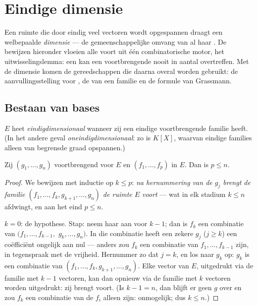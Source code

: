 \chapter{Eindige dimensie}\label{ch:b1:findim}

Een ruimte die door eindig veel vectoren wordt opgespannen draagt
een welbepaalde \emph{dimensie} --- de gemeenschappelijke omvang van
al haar . De bewijzen hieronder vloeien alle voort uit één
combinatorische motor, het uitwisselingslemma: een  kan
een voortbrengende nooit in aantal overtreffen. Met de dimensie
komen de gereedschappen die daarna overal worden gebruikt: de
aanvullingsstelling voor , de  van een familie en de
formule van Grassmann.

\section{Bestaan van bases}

\begin{definition}\label{def:b1:findim:def}
$E$ heet \emph{eindigdimensionaal} wanneer
zij een eindige voortbrengende familie heeft. (In het andere geval
\emph{oneindigdimensionaal}: zo is $K[X]$, waarvan eindige families
alleen  van begrensde graad opspannen.)
\end{definition}

\begin{theorem}[Uitwisselingslemma]\label{thm:b1:findim:exchange}
Zij $(g_1, \dots, g_n)$ voortbrengend voor $E$ en $(f_1, \dots,
f_p)$  in $E$. Dan is $p \leq n$.
\end{theorem}

\begin{proof}
We bewijzen met inductie op $k \leq p$: \emph{na hernummering van de
$g_j$ brengt de familie $(f_1, \dots, f_k, g_{k+1}, \dots, g_n)$ de
ruimte $E$ voort} --- wat in elk stadium $k \leq n$ afdwingt, en aan
het eind $p \leq n$.

$k = 0$: de hypothese. Stap: neem haar aan voor $k - 1$; dan is
$f_k$ een combinatie van $(f_1, \dots, f_{k-1},$ $g_k, \dots, g_n)$.
In die combinatie heeft een zekere $g_j$ ($j \geq k$) een
coëfficiënt ongelijk aan nul --- anders zou $f_k$ een combinatie van
$f_1, \dots, f_{k-1}$ zijn, in tegenspraak met de vrijheid.
Hernummer zo dat $j = k$, en los naar $g_k$ op: $g_k$ is een
combinatie van $(f_1, \dots, f_k, g_{k+1}, \dots, g_n)$. Elke vector
van $E$, uitgedrukt via de familie met $k-1$ vectoren, kan dan
opnieuw via de familie met $k$ vectoren worden uitgedrukt: zij
brengt voort. (Is $k - 1 = n$, dan blijft er geen $g$ over en zou
$f_k$ een combinatie van de $f_i$ alleen zijn: onmogelijk; dus $k
\leq n$.)
\end{proof}

